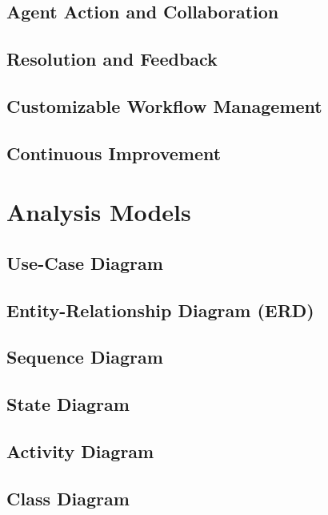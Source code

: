         \section{Agent Action and Collaboration}
            
        \section{Resolution and Feedback}
            
        \section{Customizable Workflow Management}
            
        \section{Continuous Improvement}
            

    \chapter{Analysis Models}
        \section{Use-Case Diagram}
        \section{Entity-Relationship Diagram (ERD)}
        \section{Sequence Diagram}
        \section{State Diagram}
        \section{Activity Diagram}
        \section{Class Diagram}

